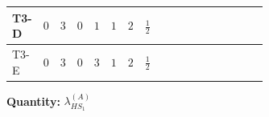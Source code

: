 \documentclass[8pt]{article}
\begin{document}
\begin{landscape}
\begin{longtable}{@{}llcccccc >{\raggedright\arraybackslash}p{0.21\linewidth} >{\raggedright\arraybackslash}p{0.21\linewidth} >{\raggedright\arraybackslash}p{0.21\linewidth}@{}}
\midrule
T3-D & $0$ & $3$ & $0$ & $1$ & $1$ & $2$ & $\frac{1}{2}$ & \scriptsize\adjustbox{max width=\linewidth}{$\begin{gathered} +8 {\lambda_{HS_1}^{(1)}} {\lambda_{HS_1}^{(A)}}\end{gathered}$} & \scriptsize\adjustbox{max width=\linewidth}{$\begin{gathered} +2 {\lambda_{HS_1}^{(A)}} {\lambda_{S_1}^{(1)}}\end{gathered}$} & \scriptsize\adjustbox{max width=\linewidth}{$\begin{gathered} {\lambda_{HS_1}^{(A)}} (6 \operatorname{Tr}\!\left({Y_d}\,\left({Y_d}\right)^{\dagger}\right)+2 \operatorname{Tr}\!\left({Y_e}\,\left({Y_e}\right)^{\dagger}\right)+6 \operatorname{Tr}\!\left({Y_u}\,\left({Y_u}\right)^{\dagger}\right)+16 {\lambda_{S_1}^{(A)}})\end{gathered}$} \\
\midrule
T3-E & $0$ & $3$ & $0$ & $3$ & $1$ & $2$ & $\frac{1}{2}$ & \scriptsize\adjustbox{max width=\linewidth}{$\begin{gathered} +8 {\lambda_{HS_1}^{(1)}} {\lambda_{HS_1}^{(A)}}\end{gathered}$} & \scriptsize\adjustbox{max width=\linewidth}{$\begin{gathered} +2 {\lambda_{HS_1}^{(A)}} {\lambda_{S_1}^{(1)}}\end{gathered}$} & \scriptsize\adjustbox{max width=\linewidth}{$\begin{gathered} {\lambda_{HS_1}^{(A)}} (6 \operatorname{Tr}\!\left({Y_d}\,\left({Y_d}\right)^{\dagger}\right)+2 \operatorname{Tr}\!\left({Y_e}\,\left({Y_e}\right)^{\dagger}\right)+6 \operatorname{Tr}\!\left({Y_u}\,\left({Y_u}\right)^{\dagger}\right)+16 {\lambda_{S_1}^{(A)}})\end{gathered}$} \\
\midrule
\bottomrule
\end{longtable}
\clearpage
\noindent\textbf{Quantity: }$\lambda_{HS_1}^{(A)}$\par\smallskip

\end{landscape}
\end{document}
